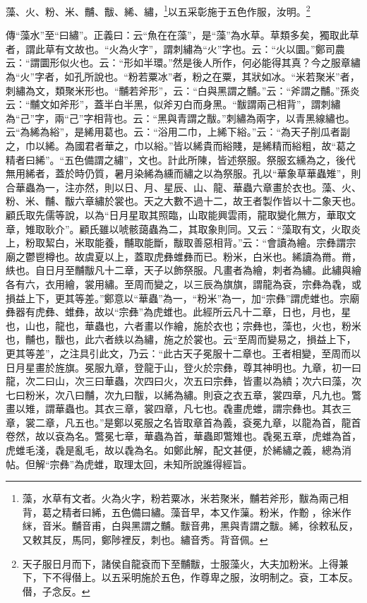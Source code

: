 藻、火、粉、米、黼、黻、絺、繡，\footnote{藻，水草有文者。火為火字，粉若粟冰，米若聚米，黼若斧形，黻為兩己相背，葛之精者曰絺，五色備曰繡。藻音早，本又作薻。粉米，作黺𪓋，徐米作{\hanaa 䋛}，音米。黼音甫，白與黑謂之黼。黻音弗，黑與青謂之黻。絺，徐敕私反，又敕其反，馬同，鄭陟裡反，刺也。繡音秀。背音佩。}以五采彰施于五色作服，汝明。\footnote{天子服日月而下，諸侯自龍袞而下至黼黻，士服藻火，大夫加粉米。上得兼下，下不得僣上。以五采明施於五色，作尊卑之服，汝明制之。袞，工本反。僣，子念反。}


{\noindent\zhuan{}\fzbyks 傳“藻水”至“曰繡”。正義曰：云“魚在在藻”，是“藻”為水草。草類多矣，獨取此草者，謂此草有文故也。“火為火字”，謂刺繡為“火”字也。云：“火以圜。”鄭司農云：“謂圜形似火也。云：“形如半環。”然是後人所作，何必能得其真？今之服章繡為“火”字者，如孔所說也。“粉若粟冰”者，粉之在粟，其狀如冰。“米若聚米”者，刺繡為文，類聚米形也。“黼若斧形”，云：“白與黑謂之黼。”云：“斧謂之黼。”孫炎云：“黼文如斧形”，蓋半白半黑，似斧刃白而身黑。“黻謂兩己相背”，謂刺繡為“己”字，兩“己”字相背也。云：“黑與青謂之黻。”刺繡為兩字，以青黑線繡也。云“為絺為綌”，是絺用葛也。云：“浴用二巾，上絺下綌。”云：“為天子削瓜者副之，巾以絺。為國君者華之，巾以綌。”皆以絺貴而綌賤，是絺精而綌粗，故“葛之精者曰絺”。“五色備謂之繡”，文也。計此所陳，皆述祭服。祭服玄纁為之，後代無用絺者，蓋於時仍質，暑月染絺為纁而繡之以為祭服。孔以“華象草華蟲雉”，則合華蟲為一，注亦然，則以日、月、星辰、山、龍、華蟲六章畫於衣也。藻、火、粉、米、黼、黻六章繡於裳也。天之大數不過十二，故王者製作皆以十二象天也。顧氏取先儒等說，以為“日月星取其照臨，山取能興雲雨，龍取變化無方，華取文章，雉取耿介”。顧氏雖以唬骸藹蟲為二，其取象則同。又云：“藻取有文，火取炎上，粉取絜白，米取能養，黼取能斷，黻取善惡相背。”云：“會讀為繪。宗彝謂宗廟之鬱鬯樽也。故虞夏以上，蓋取虎彝蜼彝而已。粉米，白米也。絺讀為黹。黹，紩也。自日月至黼黻凡十二章，天子以飾祭服。凡畫者為繪，刺者為繡。此繡與繪各有六，衣用繪，裳用繡。至周而變之，以三辰為旗旗，謂龍為袞，宗彝為毳，或損益上下，更其等差。”鄭意以“華蟲”為一，“粉米”為一，加“宗彝”謂虎蜼也。宗廟彝器有虎彝、蜼彝，故以“宗彝”為虎蜼也。此經所云凡十二章，日也，月也，星也，山也，龍也，華蟲也，六者畫以作繪，施於衣也；宗彝也，藻也，火也，粉米也，黼也，黻也，此六者紩以為繡，施之於裳也。云“至周而變易之，損益上下，更其等差”，之注具引此文，乃云：“此古天子冕服十二章也。王者相變，至周而以日月星畫於旌旗。冕服九章，登龍于山，登火於宗彝，尊其神明也。九章，初一曰龍，次二曰山，次三曰華蟲，次四曰火，次五曰宗彝，皆畫以為繢；次六曰藻，次七曰粉米，次八曰黼，次九曰黻，以絺為繡。則袞之衣五章，裳四章，凡九也。鷩畫以雉，謂華蟲也。其衣三章，裳四章，凡七也。毳畫虎蜼，謂宗彝也。其衣三章，裳二章，凡五也。”是鄭以冕服之名皆取章首為義，袞冕九章，以龍為首，龍首卷然，故以袞為名。鷩冕七章，華蟲為首，華蟲即鷩雉也。毳冕五章，虎蜼為首，虎蜼毛淺，毳是亂毛，故以毳為名。如鄭此解，配文甚便，於絺繡之義，總為消帖。但解“宗彝”為虎蜼，取理太回，未知所說誰得經旨。 \par}

